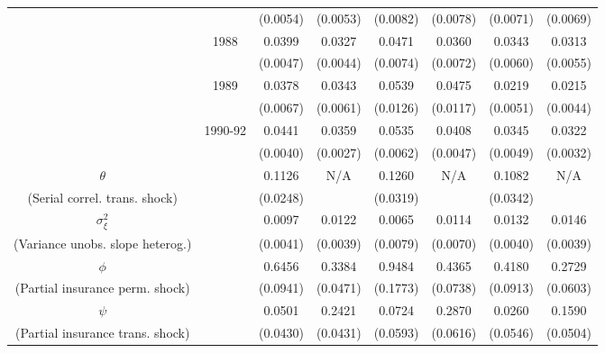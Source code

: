 \begin{table}
\begin{center}
{\begin{tabular}{cccc|cc|cc}
				\\  &                    & (0.0054) & (0.0053)  & (0.0082) & (0.0078)  & (0.0071) & (0.0069) 
				\\  & 1988 & 0.0399 &   0.0327 & 0.0471 &   0.0360 & 0.0343 &   0.0313
				\\  &                    & (0.0047) & (0.0044)  & (0.0074) & (0.0072)  & (0.0060) & (0.0055) 
				\\  & 1989 & 0.0378 &   0.0343 & 0.0539 &   0.0475 & 0.0219 &   0.0215
				\\  &                    & (0.0067) & (0.0061)  & (0.0126) & (0.0117)  & (0.0051) & (0.0044) 
				\\  & 1990-92 & 0.0441 &   0.0359 & 0.0535 &   0.0408 & 0.0345 &   0.0322 
				\\  &         & (0.0040) & (0.0027) & (0.0062) & (0.0047) & (0.0049) & (0.0032) 
				\\ \hline  
				$\theta$ &     & 0.1126 &   N/A & 0.1260 &   N/A & 0.1082 &   N/A 
				\\ (Serial correl. trans. shock) &     & (0.0248) &  & (0.0319) &  & (0.0342) &  
				\\ $\sigma^2_{\xi}$ &     & 0.0097 &   0.0122 & 0.0065 &   0.0114 & 0.0132 &   0.0146 
				\\ (Variance unobs. slope heterog.) &     & (0.0041) & (0.0039) & (0.0079) & (0.0070) & (0.0040) & (0.0039) 
				\\ \hline  
				$\phi$ &     & 0.6456 &   0.3384 & 0.9484 &   0.4365 & 0.4180 &   0.2729 
				\\ (Partial insurance perm. shock) &     & (0.0941) & (0.0471) & (0.1773) & (0.0738) & (0.0913) & (0.0603) 
				\\ $\psi$ &     & 0.0501 &   0.2421 & 0.0724 &   0.2870 & 0.0260 &   0.1590 
				\\ (Partial insurance trans. shock) &     & (0.0430) & (0.0431) & (0.0593) & (0.0616) & (0.0546) & (0.0504) 
				\\ \hline  
			\end{tabular}   
		} 
		\usebox{\ReplicationTable}  
		\settowidth\TableWidth{\usebox{\ReplicationTable}} %
	\end{center}  
\end{table}  
